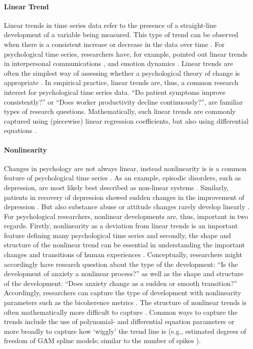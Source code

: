 \documentclass[man, 12pt, a4paper, mask, floatsintext]{apa7}
\theoremstyle{break}
\theoremstyle{plain}
\begin{document}
\paragraph{Linear Trend} Linear trends in time series data refer to the presence of a straight-line development of a variable being measured. This type of trend can be observed when there is a consistent increase or decrease in the data over time \citep{nyblom1986}. For psychological time series, researchers have, for example, pointed out linear trends in interpersonal communications \citep{vasileiadou2014}, and emotion dynamics \citep{oravecz2016}. Linear trends are often the simplest way of assessing whether a psychological theory of change is appropriate \citep{gottman1969}. In empirical practice, linear trends are, thus, a common research interest for psychological time series data. ``Do patient symptoms improve consistently?'' or ``Does worker productivity decline continuously?'', are familiar types of research questions. Mathematically, such linear trends are commonly captured using (piecewise) linear regression coefficients, but also using differential equations \citep{chow2019}. 

\paragraph{Nonlinearity} Changes in psychology are not always linear, instead nonlinearity is is a common feature of psychological time series \citep{hayes2007}. As an example, episodic disorders, such as depression, are most likely best described as non-linear systems \citep{hosenfeld2015}. Similarly, patients in recovery of depression showed sudden changes in the improvement of depression \citep{helmich2020a}. But also substance abuse \citep{boker1998} or attitude changes rarely develop linearly \citep{vandermaas2003}. For psychological researchers, nonlinear developments are, thus, important in two regards. Firstly, nonlinearity as a deviation from linear trends is an important feature defining many psychological time series and secondly, the shape and structure of the nonlinear trend can be essential in understanding the important changes and transitions of human experiences \citep{chow2019}. Conceptually, researchers might accordingly have research question about the type of the development: ``Is the development of anxiety a nonlinear process?'' as well as the shape and structure of the development: ``Does anxiety change as a sudden or smooth transition?'' Accordingly, researchers can capture the type of development with nonlinearity parameters such as the bicoherence metrics \citep{cuddy2009}. The structure of nonlinear trends is often mathematically more difficult to capture \citep{castro-alvarez2022a}. Common ways to capture the trends include the use of polynomial- and differential equation parameters or more broadly to capture how `wiggly' the trend line is (e.g., estimated degrees of freedom of GAM spline models; similar to the number of spikes \citealp[]{caro-martin2018}). 
\end{document}
